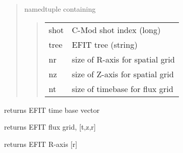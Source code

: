 \documentclass[letterpaper,10pt,english]{sphinxmanual}
\begin{document}
\begin{fulllineitems}
\begin{fulllineitems}
\begin{quote}
\begin{description}
namedtuple containing
\begin{quote}

\begin{tabulary}{\linewidth}{|L|L|}
\hline

shot
 & 
C-Mod shot index (long)
\\

tree
 & 
EFIT tree (string)
\\

nr
 & 
size of R-axis for spatial grid
\\

nz
 & 
size of Z-axis for spatial grid
\\

nt
 & 
size of timebase for flux grid
\\
\hline\end{tabulary}

\end{quote}


\end{description}\end{quote}

\end{fulllineitems}


\begin{fulllineitems}
\label{eqtools:eqtools.EFIT.EFITTree.getTimeBase}
returns EFIT time base vector

\end{fulllineitems}


\begin{fulllineitems}
\label{eqtools:eqtools.EFIT.EFITTree.getFluxGrid}
returns EFIT flux grid, {[}t,z,r{]}

\end{fulllineitems}


\begin{fulllineitems}
\label{eqtools:eqtools.EFIT.EFITTree.getRGrid}
returns EFIT R-axis {[}r{]}

\end{fulllineitems}



\end{fulllineitems}
\end{document}
